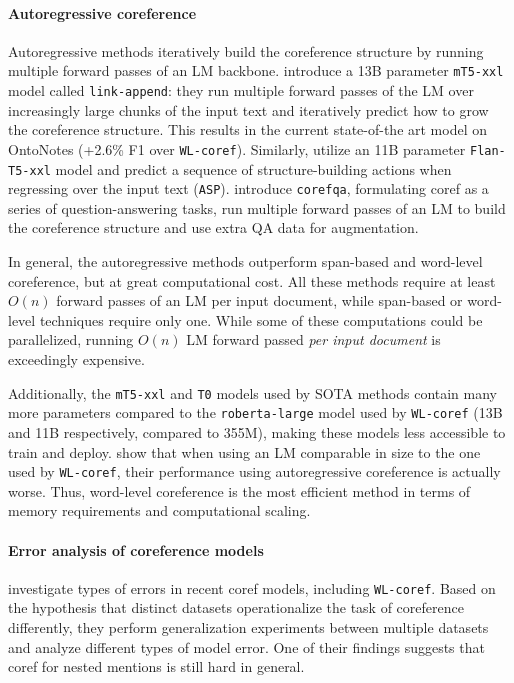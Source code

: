 \documentclass[11pt]{article}
\newcommand\wlcoref{{\texttt{WL-coref}}}
\begin{document}
\paragraph{Autoregressive coreference} Autoregressive methods iteratively build the coreference structure by running multiple forward passes of an LM backbone. \citet{bohnet2023coreference} introduce a 13B parameter \texttt{mT5-xxl} model called \texttt{link-append}: they run multiple forward passes of the LM over increasingly large chunks of the input text and iteratively predict how to grow the coreference structure. This results in the current state-of-the art model on OntoNotes (+2.6\% F1 over \wlcoref{}). Similarly, \citet{liu2022autoregressive} utilize an 11B parameter \texttt{Flan-T5-xxl} model \citep{chung2022scaling} and predict a sequence of structure-building actions when regressing over the input text (\texttt{ASP}). \citet{wu2020corefqa} introduce \texttt{corefqa}, formulating coref as a series of question-answering tasks, run multiple forward passes of an LM to build the coreference structure and use extra QA data for augmentation.

In general, the autoregressive methods outperform span-based and word-level coreference, but at great computational cost. All these methods require at least $O(n)$ forward passes of an LM per input document, while span-based or word-level techniques require only one. While some of these computations could be parallelized, running $O(n)$ LM forward passed \emph{per input document} is exceedingly expensive.

Additionally, the \texttt{mT5-xxl} and \texttt{T0} models used by SOTA methods contain many more parameters compared to the \texttt{roberta-large} model used by \wlcoref{} (13B and 11B respectively, compared to 355M), making these models less accessible to train and deploy. \citet{liu2022autoregressive} show that when using an LM comparable in size to the one used by \wlcoref{}, their performance using autoregressive coreference is actually worse. Thus, word-level coreference is the most efficient method in terms of memory requirements and computational scaling.

\paragraph{Error analysis of coreference models} 
\citet{porada2023investigating} investigate types of errors in recent coref models, including \wlcoref{}. Based on the hypothesis that distinct datasets operationalize the task of coreference differently, they perform generalization experiments between multiple datasets and analyze different types of model error. One of their findings suggests that coref for nested mentions is still hard in general.
\end{document}
